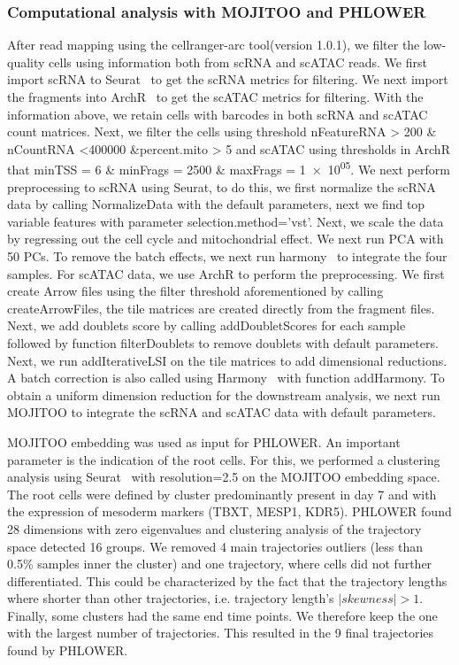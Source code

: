 \subsubsection{Computational analysis with MOJITOO and PHLOWER}
After read mapping using the cellranger-arc tool(version 1.0.1), we filter the low-quality cells using information both from scRNA and scATAC reads. We first import scRNA to Seurat~\citep{stuart2019seurat3} to get the scRNA metrics for filtering. We next import the fragments into ArchR~\citep{granja2021archr} to get the scATAC metrics for filtering. With the information above, we retain cells with barcodes in both scRNA and scATAC count matrices. Next, we filter the cells using threshold nFeatureRNA > \num{200} \& nCountRNA <\num{400000} \&percent.mito > 5 and scATAC using thresholds in ArchR that minTSS = \num{6} \& minFrags = \num{2500} \& maxFrags = \num{1e+05}. We next perform preprocessing to scRNA using Seurat, to do this, we first normalize the scRNA data by calling NormalizeData with the default parameters, next we find top variable features with parameter selection.method='vst'. Next, we scale the data by regressing out the cell cycle and mitochondrial effect. We next run PCA with 50 PCs. To remove the batch effects, we next run harmony~\citep{korsunsky2019harmony} to integrate the four samples. For scATAC data, we use ArchR to perform the preprocessing. We first create Arrow files using the filter threshold aforementioned by calling createArrowFiles, the tile matrices are created directly from the fragment files. Next, we add doublets score by calling addDoubletScores for each sample followed by function filterDoublets to remove doublets with default parameters. Next, we run addIterativeLSI on the tile matrices to add dimensional reductions. A batch correction is also called using Harmony~\citep{korsunsky2019harmony} with function addHarmony. To obtain a uniform dimension reduction for the downstream analysis, we next run MOJITOO to integrate the scRNA and scATAC data with default parameters.

MOJITOO embedding was used as input for PHLOWER. An important parameter is the indication of the root cells. For this, we performed a clustering analysis using Seurat~\citep{stuart2019seurat3} with resolution=\num{2.5} on the MOJITOO embedding space. The root cells were defined by cluster predominantly present in day \num{7} and with the expression of mesoderm markers (TBXT, MESP1, KDR5). PHLOWER found \num{28} dimensions with zero eigenvalues and clustering analysis of the trajectory space detected 16 groups. We removed \num{4} main trajectories outliers (less than 0.5\% samples inner the cluster) and one trajectory, where cells did not further differentiated. This could be characterized by the fact that the trajectory lengths where shorter than other trajectories, i.e. trajectory length's $|skewness| > 1$.
Finally, some clusters had the same end time points. We therefore keep the one with the largest number of trajectories. This resulted in the \num{9} final trajectories found by PHLOWER.


